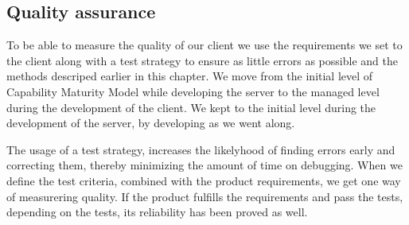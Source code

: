 \subsection{Quality assurance}
To be able to measure the quality of our client we use the requirements we set to the client along with a test strategy to ensure as little errors as possible and the methods descriped earlier in this chapter. We move from the initial level of Capability Maturity Model while developing the server to the managed level during the development of the client. We kept to the initial level during the development of the server, by developing as we went along.

The usage of a test strategy, increases the likelyhood of finding errors early and correcting them, thereby minimizing the amount of time on debugging. When we define the test criteria, combined with the product requirements, we get one way of measurering quality. If the product fulfills the requirements and pass the tests, depending on the tests, its reliability has been proved as well.

 